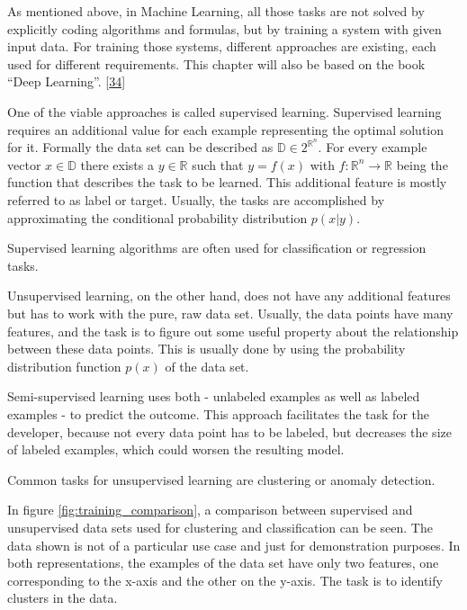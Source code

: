 \documentclass[12pt,english,a4paper,oneside,,tablecaptionabove]{scrbook}
\begin{document}
As mentioned above, in Machine Learning, all those tasks are not solved
by explicitly coding algorithms and formulas, but by training a system
with given input data. For training those systems, different approaches
are existing, each used for different requirements. This chapter will
also be based on the book \enquote{Deep Learning}.
{[}\protect\hyperlink{ref-Goodfellow-et-al-2016}{34}{]}

One of the viable approaches is called supervised learning. Supervised
learning requires an additional value for each example representing the
optimal solution for it. Formally the data set can be described as
\(\mathbb{D} \in 2^{\mathbb{R}^n}\). For every example vector
\(x \in \mathbb{D}\) there exists a \(y \in \mathbb{R}\) such that
\(y=f(x)\) with \(f:\mathbb{R}^n \rightarrow \mathbb{R}\) being the
function that describes the task to be learned. This additional feature
is mostly referred to as label or target. Usually, the tasks are
accomplished by approximating the conditional probability distribution
\(p(x|y)\).

Supervised learning algorithms are often used for classification or
regression tasks.

Unsupervised learning, on the other hand, does not have any additional
features but has to work with the pure, raw data set. Usually, the data
points have many features, and the task is to figure out some useful
property about the relationship between these data points. This is
usually done by using the probability distribution function \(p(x)\) of
the data set.

Semi-supervised learning uses both - unlabeled examples as well as
labeled examples - to predict the outcome. This approach facilitates the
task for the developer, because not every data point has to be labeled,
but decreases the size of labeled examples, which could worsen the
resulting model.

Common tasks for unsupervised learning are clustering or anomaly
detection.

In figure \ref{fig:training_comparison}, a comparison between supervised
and unsupervised data sets used for clustering and classification can be
seen. The data shown is not of a particular use case and just for
demonstration purposes. In both representations, the examples of the
data set have only two features, one corresponding to the x-axis and the
other on the y-axis. The task is to identify clusters in the data.
\end{document}
